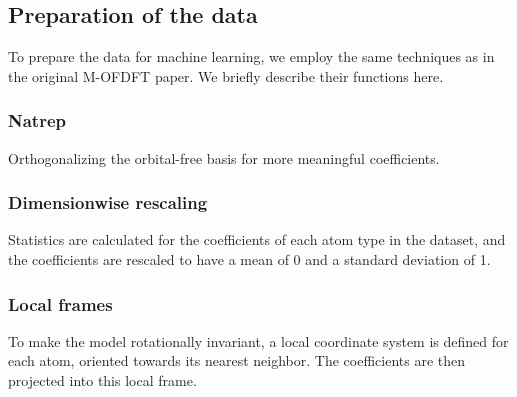 \subsection{Preparation of the data}
To prepare the data for machine learning, we employ the same techniques as in the original M-OFDFT \cite{zhang_m-ofdft_2023} paper. We briefly describe their functions here.
\subsubsection{Natrep}
Orthogonalizing the orbital-free basis for more meaningful coefficients.
\subsubsection{Dimensionwise rescaling}
Statistics are calculated for the coefficients of each atom type in the dataset, and the coefficients are rescaled to have a mean of 0 and a standard deviation of 1.
\subsubsection{Local frames}
To make the model rotationally invariant, a local coordinate system is defined for each atom, oriented towards its nearest neighbor. The coefficients are then projected into this local frame.
